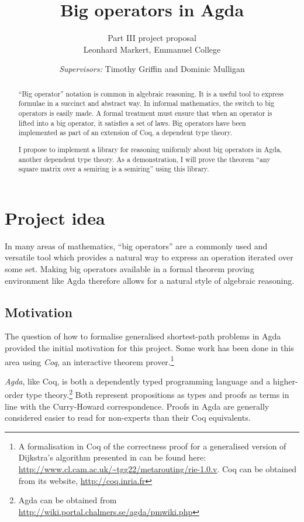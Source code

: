 \documentclass[a4paper]{scrartcl}
\title{Big operators in Agda}
\author{Part III project proposal\\
	Leonhard Markert, Emmanuel College}
\date{\textit{Supervisors:} Timothy Griffin and Dominic Mulligan}
\begin{document}
\maketitle

\begin{abstract}
\enquote{Big operator} notation is common in algebraic reasoning.
It is a useful tool to express formulae in a succinct and abstract way.
In informal mathematics, the switch to big operators is easily made.
A formal treatment must ensure that when an operator is lifted into a big operator, it satisfies a set of laws.
Big operators have been implemented as part of an extension of Coq, a dependent type theory.

I propose to implement a library for reasoning uniformly about big operators in Agda, another dependent type theory.
As a demonstration, I will prove the theorem \enquote{any square matrix over a semiring is a semiring} using this library.
\end{abstract}

\section{Project idea}

In many areas of mathematics, \enquote{big operators} are a commonly used and versatile tool which provides a natural way to express an operation iterated over some set. Making big operators available in a formal theorem proving environment like Agda therefore allows for a natural style of algebraic reasoning.

\subsection{Motivation}

The question of how to formalise generalised shortest-path problems in Agda provided the initial motivation for this project.
Some work has been done in this area using \emph{Coq}, an interactive theorem prover.\footnote{A formalisation in Coq of the correctness proof for a generalised version of Dijkstra's algorithm presented in \autocite{sobrinho_routing_2010} can be found here: \url{http://www.cl.cam.ac.uk/~tgg22/metarouting/rie-1.0.v}. Coq can be obtained from its website, \url{http://coq.inria.fr}}

\emph{Agda}, like Coq, is both a dependently typed programming language and a higher-order type theory.\footnote{Agda can be obtained from \url{http://wiki.portal.chalmers.se/agda/pmwiki.php}} Both represent propositions as types and proofs as terms in line with the Curry-Howard correspondence.
Proofs in Agda are generally considered easier to read for non-experts than their Coq equivalents.
\end{document}
